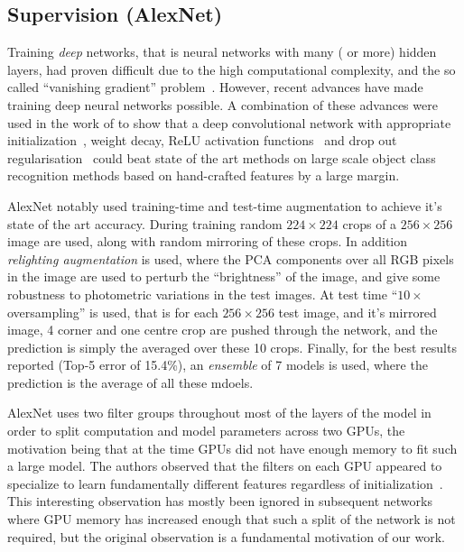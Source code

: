 \documentclass[thesis]{subfiles}
\begin{document}
\subsection{Supervision (AlexNet)}
Training \emph{deep} networks, that is neural networks with many ( or more) hidden layers, had proven difficult due to the high computational complexity, and the so called ``vanishing gradient'' problem~\citep{bengio:ieeenn94}. However, recent advances have made training deep neural networks possible. A combination of these advances were used in the work of \citet{Krizhevsky2012imanet} to show that a deep convolutional network with appropriate initialization~\citep{Sutskever2013momentum}, weight decay, ReLU activation functions~\citep{conf/icml/NairH10} and drop out regularisation~\citep{1207.0580v1} could beat state of the art methods on large scale object class recognition methods based on hand-crafted features by a large margin. 

AlexNet notably used training-time and test-time augmentation to achieve it's state of the art accuracy. During training random $224 \times 224$ crops of a $256 \times 256$ image are used, along with random mirroring of these crops. In addition \emph{relighting augmentation} is used, where the PCA components over all RGB pixels in the image are used to perturb the ``brightness'' of the image, and give some robustness to photometric variations in the test images. At test time ``$10\times$ oversampling'' is used, that is for each $256\times 256$ test image, and it's mirrored image, 4 corner and one centre crop are pushed through the network, and the prediction is simply the averaged over these 10 crops. Finally, for the best results reported (Top-5 error of 15.4\%), an \emph{ensemble} of 7 models is used, where the prediction is the average of all these mdoels. 

AlexNet uses two filter groups throughout most of the layers of the model in order to split computation and model parameters across two GPUs, the motivation being that at the time GPUs did not have enough memory to fit such a large model. The authors observed that the filters on each GPU appeared to specialize to learn fundamentally different features regardless of initialization~\citep{Krizhevsky2012imanet}. This interesting observation has mostly been ignored in subsequent networks where GPU memory has increased enough that such a split of the network is not required, but the original observation is a fundamental motivation of our work.
\end{document}
